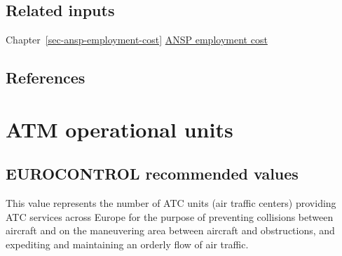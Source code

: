 \documentclass[
  11pt,
  a4paper,
]{book}
\begin{document}
\hypertarget{related-inputs-14}{%
\section{Related inputs}\label{related-inputs-14}}

Chapter~\ref{sec-ansp-employment-cost}
\protect\hyperlink{sec-ansp-employment-cost}{ANSP employment cost}

\hypertarget{references-14}{%
\section{References}\label{references-14}}

\hypertarget{sec-atm-operational-units}{%
\chapter{ATM operational units}\label{sec-atm-operational-units}}

\hypertarget{eurocontrol-recommended-values-14}{%
\section{EUROCONTROL recommended
values}\label{eurocontrol-recommended-values-14}}

This value represents the number of ATC units (air traffic centers)
providing ATC services across Europe for the purpose of preventing
collisions between aircraft and on the maneuvering area between aircraft
and obstructions, and expediting and maintaining an orderly flow of air
traffic.
\end{document}
